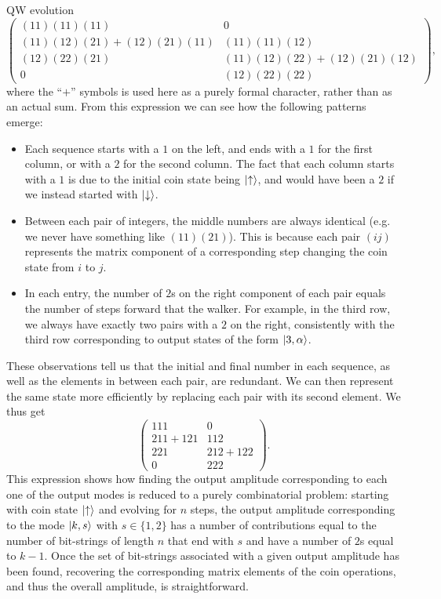 \begin{examplebox}[label={ex:QWs:bimatrix_notation}]{QW evolution}
    \begin{equation}
        \begin{pmatrix}
            (11)(11)(11) & 0 \\
            (11)(12)(21) + (12)(21)(11) & (11)(11)(12) \\
            (12)(22)(21) & (11)(12)(22) + (12)(21)(12) \\
            0 & (12)(22)(22)
        \end{pmatrix},
    \end{equation}
    where the ``$+$'' symbols is used here as a purely formal character, rather than as an actual sum. From this expression we can see how the following patterns emerge:
    \begin{itemize}
        \item Each sequence starts with a $1$ on the left, and ends with a $1$ for the first column, or with a $2$ for the second column. The fact that each column starts with a $1$ is due to the initial coin state being $\ket\uparrow$, and would have been a $2$ if we instead started with $\ket\downarrow$.
        \item Between each pair of integers, the middle numbers are always identical (e.g. we never have something like $(11)(21)$). This is because each pair $(ij)$ represents the matrix component of a corresponding step changing the coin state from $i$ to $j$.
        \item In each entry, the number of $2$s on the right component of each pair equals the number of steps forward that the walker. For example, in the third row, we always have exactly two pairs with a $2$ on the right, consistently with the third row corresponding to output states of the form $\ket{3,\alpha}$.
    \end{itemize}
    These observations tell us that the initial and final number in each sequence, as well as the elements in between each pair, are redundant. We can then represent the same state more efficiently by replacing each pair with its second element. We thus get
    \begin{equation}
        \begin{pmatrix}
            111 & 0 \\
            211 + 121 & 112 \\
            221 & 212 + 122 \\
            0 & 222
        \end{pmatrix}.
    \end{equation}
    This expression shows how finding the output amplitude corresponding to each one of the output modes is reduced to a purely combinatorial problem: starting with coin state $\ket\uparrow$ and evolving for $n$ steps, the output amplitude corresponding to the mode $\ket{k,s}$ with $s\in\{1,2\}$ has a number of contributions equal to the number of bit-strings of length $n$ that end with $s$ and have a number of $2$s equal to $k-1$.
    Once the set of bit-strings associated with a given output amplitude has been found, recovering the corresponding matrix elements of the coin operations, and thus the overall amplitude, is straightforward.


\end{examplebox}
